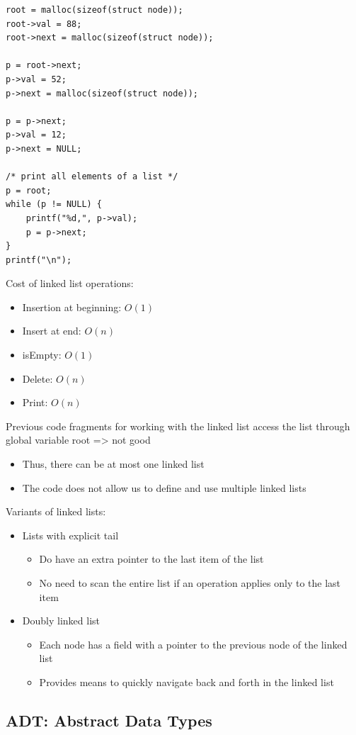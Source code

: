 \begin{center}
\begin{minipage}{0.6\textwidth}

\begin{lstlisting}
root = malloc(sizeof(struct node));
root->val = 88;
root->next = malloc(sizeof(struct node));

p = root->next;
p->val = 52;
p->next = malloc(sizeof(struct node));

p = p->next;
p->val = 12;
p->next = NULL;

/* print all elements of a list */
p = root;
while (p != NULL) {
    printf("%d,", p->val);
    p = p->next;
}
printf("\n");
\end{lstlisting}
\end{minipage}
\end{center}

Cost of linked list operations:
\begin{itemize}
    \item Insertion at beginning: $O(1)$
    \item Insert at end: $O(n)$
    \item isEmpty: $O(1)$
    \item Delete: $O(n)$
    \item Print: $O(n)$
\end{itemize}
Previous code fragments for working with the linked list access the list through global variable root => not good
\begin{itemize}
    \item Thus, there can be at most one linked list
    \item The code does not allow us to define and use multiple linked lists
\end{itemize}

Variants of linked lists:
\begin{itemize}
    \item Lists with explicit tail
    \begin{itemize}
        \item Do have an extra pointer to the last item of the list
        \item No need to scan the entire list if an operation applies only to the last item
    \end{itemize}
    \item Doubly linked list
    \begin{itemize}
        \item Each node has a field with a pointer to the previous node of the linked list
        \item Provides means to quickly navigate back and forth in the linked list
    \end{itemize}
\end{itemize}


\subsection{ADT: Abstract Data Types}
